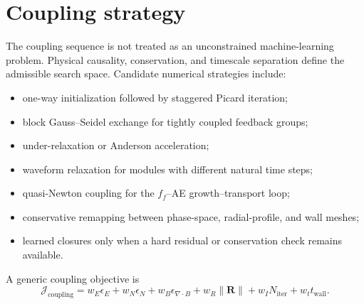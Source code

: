 \documentclass[11pt]{article}
\begin{document}
\section{Coupling strategy}
The coupling sequence is not treated as an unconstrained machine-learning problem. Physical causality, conservation, and timescale separation define the admissible search space. Candidate numerical strategies include:
\begin{itemize}[leftmargin=1.6em]
\item one-way initialization followed by staggered Picard iteration;
\item block Gauss--Seidel exchange for tightly coupled feedback groups;
\item under-relaxation or Anderson acceleration;
\item waveform relaxation for modules with different natural time steps;
\item quasi-Newton coupling for the $f_f$--AE growth--transport loop;
\item conservative remapping between phase-space, radial-profile, and wall meshes;
\item learned closures only when a hard residual or conservation check remains available.
\end{itemize}
A generic coupling objective is
\begin{equation}
\mathcal J_{\mathrm{coupling}}=w_E\epsilon_E+w_N\epsilon_N+w_B\epsilon_{\nabla\cdot B}+w_R\lVert\mathbf R\rVert+w_I N_{\mathrm{iter}}+w_t t_{\mathrm{wall}}.
\end{equation}
\end{document}
